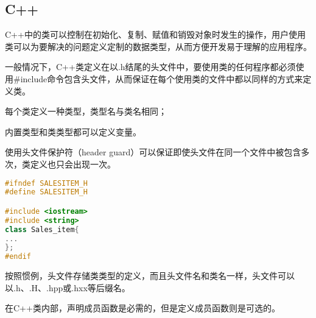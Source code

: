 \begin{lstlisting}[language=C++]

\end{lstlisting}



\begin{lstlisting}[language=C++]

\end{lstlisting}




\begin{lstlisting}[language=C++]

\end{lstlisting}



\begin{lstlisting}[language=C++]

\end{lstlisting}



\subsection{C++}

C++中的类可以控制在初始化、复制、赋值和销毁对象时发生的操作，用户使用类可以为要解决的问题定义定制的数据类型，从而方便开发易于理解的应用程序。

一般情况下，C++类定义在以.h结尾的头文件中，要使用类的任何程序都必须使用\#include命令包含头文件，从而保证在每个使用类的文件中都以同样的方式来定义类。

\begin{compactitem}
\item 每个类定义一种类型，类型名与类名相同；
\item 内置类型和类类型都可以定义变量。
\end{compactitem}

使用头文件保护符（header guard）可以保证即使头文件在同一个文件中被包含多次，类定义也只会出现一次。

\begin{lstlisting}[language=C++]
#ifndef SALESITEM_H
#define SALESITEM_H

#include <iostream>
#include <string>
class Sales_item{
...
};
#endif
\end{lstlisting}


按照惯例，头文件存储类类型的定义，而且头文件名和类名一样，头文件可以以.h、.H、.hpp或.hxx等后缀名。

在C++类内部，声明成员函数是必需的，但是定义成员函数则是可选的。

